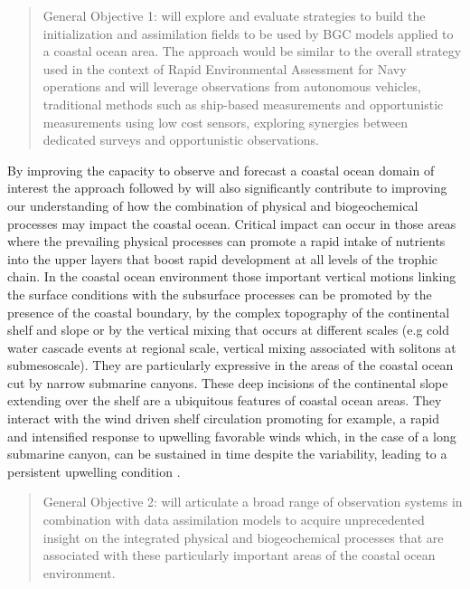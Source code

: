 \begin{quote}
  \textsf{General Objective 1:} \proj will explore and evaluate
  strategies to build the initialization and assimilation fields to be
  used by BGC models applied to a coastal ocean area. The approach
  would be similar to the overall strategy used in the context of
  Rapid Environmental Assessment for Navy operations and will leverage
  observations from autonomous vehicles, traditional methods such as
  ship-based measurements and opportunistic measurements using low
  cost sensors, exploring synergies between dedicated surveys and
  opportunistic observations.
\end{quote}
 
By improving the capacity to observe and forecast a coastal ocean
domain of interest the approach followed by \proj will also
significantly contribute to improving our understanding of how the
combination of physical and biogeochemical processes may impact the
coastal ocean. Critical impact can occur in those areas where the
prevailing physical processes can promote a rapid intake of nutrients
into the upper layers that boost rapid development at all levels of
the trophic chain. In the coastal ocean environment those important
vertical motions linking the surface conditions with the subsurface
processes can be promoted by the presence of the coastal boundary, by
the complex topography of the continental shelf and slope or by the
vertical mixing that occurs at different scales (e.g cold water
cascade events at regional scale, vertical mixing associated with
solitons at submesoscale). They are particularly expressive in the
areas of the coastal ocean cut by narrow submarine canyons. These deep
incisions of the continental slope extending over the shelf are a
ubiquitous features of coastal ocean areas.  They interact with the
wind driven shelf circulation promoting for example, a rapid and
intensified response to upwelling favorable winds \cite{she00} which,
in the case of a long submarine canyon, can be sustained in time
despite the variability, leading to a persistent upwelling condition
\cite{allen00}.

\begin{quote} 
  \textsf{General Objective 2:} \proj will articulate a broad range of
  observation systems in combination with data assimilation models to
  acquire unprecedented insight on the integrated physical and
  biogeochemical processes that are associated with these particularly
  important areas of the coastal ocean environment.
\end{quote} 

